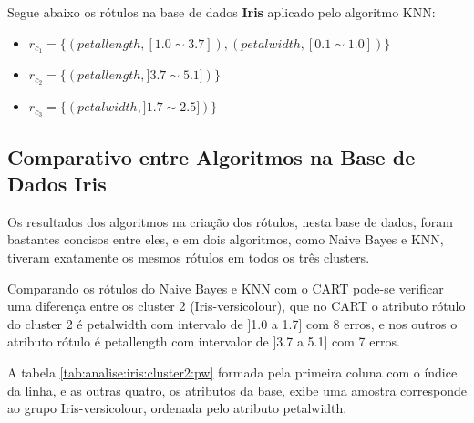 Segue abaixo os rótulos na base de dados \textbf{Iris} aplicado pelo algoritmo KNN:
\begin{itemize}[noitemsep]
 \item ${r_{c_1}=\{ (petallength, [ 1.0 \sim 3.7]), (petalwidth,[ 0.1 \sim 1.0 ] ) \} }$  
 \item ${r_{c_2}=\{ (petallength, ] 3.7 \sim 5.1]) \} }$
 \item ${r_{c_3}=\{ (petalwidth, ] 1.7 \sim 2.5 ]) \} }$
\end{itemize}

\subsection{Comparativo entre Algoritmos na Base de Dados Iris} \label{cap:resultados:ssec:compalgoritmos:iris}

Os resultados dos algoritmos na criação dos rótulos, nesta base de dados, foram bastantes concisos entre eles, e em dois algoritmos, como Naive Bayes e KNN, tiveram exatamente os mesmos rótulos em todos os três clusters.

Comparando os rótulos do Naive Bayes e KNN com o CART pode-se verificar uma diferença entre os cluster 2 (Iris-versicolour), que no CART o atributo rótulo do cluster 2 é petalwidth com intervalo de ]1.0 a 1.7] com 8 erros, e nos outros o atributo rótulo é petallength com intervalor de ]3.7 a 5.1] com 7 erros. 

A tabela \ref{tab:analise:iris:cluster2:pw} formada pela primeira coluna com o índice da linha, e as outras quatro, os atributos da base, exibe uma amostra corresponde ao grupo Iris-versicolour, ordenada pelo atributo petalwidth.

